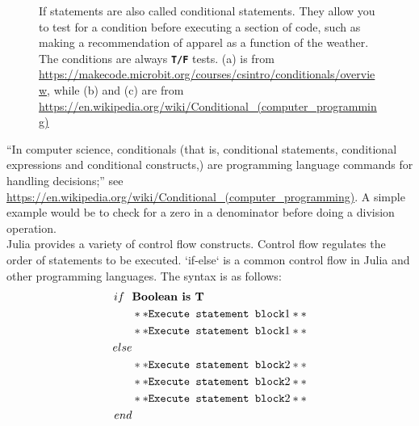 \begin{figure}[htb]%
\centering
{}
\hspace{5pt}%
\hspace{5pt}%

\caption[]{If statements are also called conditional statements. They allow you to test for a condition before executing a section of code, such as making a recommendation of apparel as a function of the weather. The conditions are always \texttt{\bf T/F} tests. (a) is from \url{https://makecode.microbit.org/courses/csintro/conditionals/overview}, while (b) and (c) are from \url{https://en.wikipedia.org/wiki/Conditional_(computer_programming)}}
    \label{fig:IfThenElse}
\end{figure}


``In computer science, conditionals (that is, conditional statements, conditional expressions and conditional constructs,) are programming language commands for handling decisions;''  see \url{https://en.wikipedia.org/wiki/Conditional_(computer_programming)}. A simple example would be to check for a zero in a denominator before doing a division operation.\\

Julia provides a variety of control flow constructs. Control flow regulates the order of statements to be executed. `if-else` is a common control flow in Julia and other programming languages. The syntax is as follows:
\begin{align*}
if~~ & \textbf{Boolean is \textbf{T}}   \\
& **\texttt{Execute statement block} 1** \\
& **\texttt{Execute statement block} 1** \\
else\\    
& **\texttt{Execute statement block} 2** \\
& **\texttt{Execute statement block} 2** \\
& ** \texttt{Execute statement block} 2** \\
end
\end{align*}


